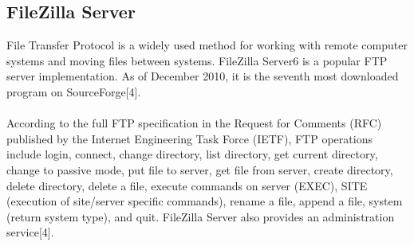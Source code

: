 \subsection{FileZilla Server}
File Transfer Protocol is a widely used method for working
with remote computer systems and moving files between
systems. FileZilla Server6 is a popular FTP server implementation.
As of December 2010, it is the seventh most
downloaded program on SourceForge[4].
\paragraph*{}
According to the full FTP specification in the Request for
Comments (RFC) published by the Internet Engineering
Task Force (IETF), FTP operations include login, connect,
change directory, list directory, get current directory,
change to passive mode, put file to server, get file from
server, create directory, delete directory, delete a file,
execute commands on server (EXEC), SITE (execution of
site/server specific commands), rename a file, append a file,
system (return system type), and quit. FileZilla Server also
provides an administration service[4].

